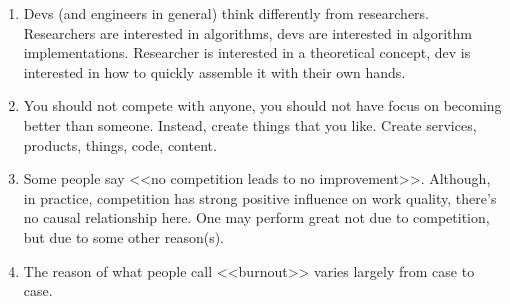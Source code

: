 \documentclass[11pt]{article}
\theoremstyle{remark}
\theoremstyle{definition}
\begin{document}
\begin{enumerate}

\item Devs (and engineers in general) think differently from researchers. Researchers are interested in algorithms, devs are interested in algorithm implementations. Researcher is interested in a theoretical concept, dev is interested in how to quickly assemble it with their own hands.


\item You should not compete with anyone, you should not have focus on becoming better than someone. Instead, create things that you like. Create services, products, things, code, content.


\item Some people say <<no competition leads to no improvement>>. Although, in practice, competition has strong positive influence on work quality, there's no causal relationship here. One may perform great not due to competition, but due to some other reason(s).






\item The reason of what people call <<burnout>> varies largely from case to case. 



\end{enumerate}
\end{document}
